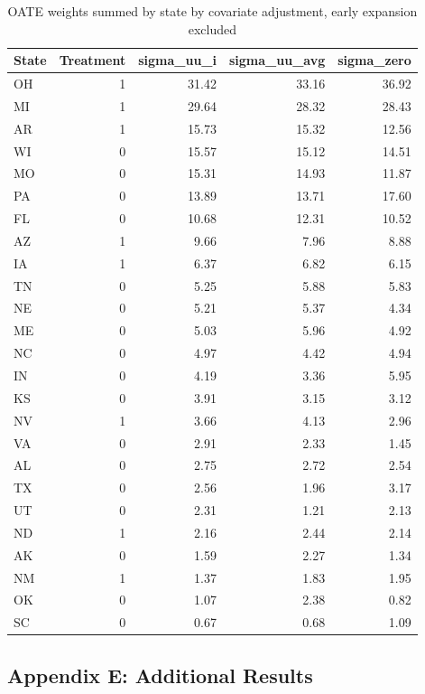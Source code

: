 \documentclass[12pt]{article}
\begin{document}
\begin{table}[ht]
\centering
\begin{tabular}{lrrrr}
  \toprule
State & Treatment & sigma\_uu\_i & sigma\_uu\_avg & sigma\_zero \\ 
  \midrule
OH & 1 & 31.42 & 33.16 & 36.92 \\ 
  MI & 1 & 29.64 & 28.32 & 28.43 \\ 
  AR & 1 & 15.73 & 15.32 & 12.56 \\ 
  WI & 0 & 15.57 & 15.12 & 14.51 \\ 
  MO & 0 & 15.31 & 14.93 & 11.87 \\ 
  PA & 0 & 13.89 & 13.71 & 17.60 \\ 
  FL & 0 & 10.68 & 12.31 & 10.52 \\ 
  AZ & 1 & 9.66 & 7.96 & 8.88 \\ 
  IA & 1 & 6.37 & 6.82 & 6.15 \\ 
  TN & 0 & 5.25 & 5.88 & 5.83 \\ 
  NE & 0 & 5.21 & 5.37 & 4.34 \\ 
  ME & 0 & 5.03 & 5.96 & 4.92 \\ 
  NC & 0 & 4.97 & 4.42 & 4.94 \\ 
  IN & 0 & 4.19 & 3.36 & 5.95 \\ 
  KS & 0 & 3.91 & 3.15 & 3.12 \\ 
  NV & 1 & 3.66 & 4.13 & 2.96 \\ 
  VA & 0 & 2.91 & 2.33 & 1.45 \\ 
  AL & 0 & 2.75 & 2.72 & 2.54 \\ 
  TX & 0 & 2.56 & 1.96 & 3.17 \\ 
  UT & 0 & 2.31 & 1.21 & 2.13 \\ 
  ND & 1 & 2.16 & 2.44 & 2.14 \\ 
  AK & 0 & 1.59 & 2.27 & 1.34 \\ 
  NM & 1 & 1.37 & 1.83 & 1.95 \\ 
  OK & 0 & 1.07 & 2.38 & 0.82 \\ 
  SC & 0 & 0.67 & 0.68 & 1.09 \\ 
   \bottomrule
\end{tabular}
\caption{OATE weights summed by state by covariate adjustment, early expansion excluded}
\label{tab:oatestateweightsc2}
\end{table}

\subsection{Appendix E: Additional Results}
\label{ssec:allresults}
\end{document}
